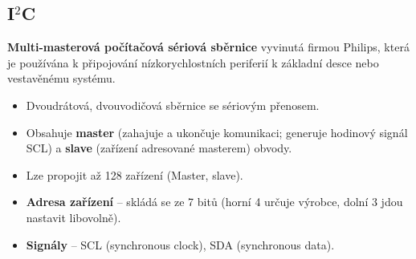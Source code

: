 \subsection{I$^2$C}
\textbf{Multi-masterová počítačová sériová sběrnice} vyvinutá firmou Philips, která je používána k připojování nízkorychlostních periferií k základní desce nebo vestavěnému systému.
\begin{itemize}
\item Dvoudrátová, dvouvodičová sběrnice se sériovým přenosem.
\item Obsahuje \textbf{master} (zahajuje a ukončuje komunikaci; generuje hodinový signál SCL) a \textbf{slave} (zařízení adresované masterem) obvody.
\item Lze propojit až 128 zařízení (Master, slave).
\item \textbf{Adresa zařízení} -- skládá se ze 7 bitů (horní 4 určuje výrobce, dolní 3 jdou nastavit libovolně).
\item \textbf{Signály} -- SCL (synchronous clock), SDA (synchronous data).
\end{itemize}